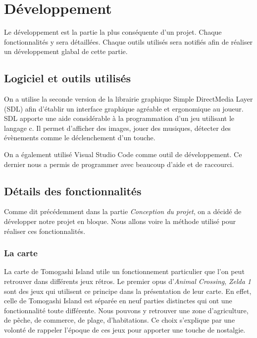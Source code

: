 \documentclass{article}
\begin{document}
\section{Développement}
    Le développement est la partie la plus conséquente d'un projet. Chaque fonctionnalités y sera détaillées. Chaque outils utilisés sera notifiés afin de réaliser un développement glabal de cette partie.

    \subsection{Logiciel et outils utilisés}
    On a utilise la seconde version de la librairie graphique Simple DirectMedia Layer (SDL) afin d’établir un interface graphique agréable et ergonomique au joueur. SDL apporte une aide considérable à la programmation d’un jeu utilisant le langage c. Il permet d’afficher des images, jouer des musiques, détecter des évènements comme le déclenchement d’un touche. 

    On a également utilisé Visual Studio Code comme outil de développement. Ce dernier nous a permis de programmer avec beaucoup d'aide et de raccourci. 

    
    \subsection{Détails des fonctionnalités}
        Comme dit précédemment dans la partie \textit{Conception du projet}, on a décidé de développer notre projet en bloque. Nous allons voire la méthode utilisé pour réaliser ces fonctionnalités.
        \subsubsection{La carte}
        La carte de Tomogashi Island utile un fonctionnement particulier que l’on peut retrouver dans différents jeux rétros. Le premier opus d’\textit{Animal Crossing}, \textit{Zelda 1} sont des jeux qui utilisent ce principe dans la présentation de leur carte. En effet, celle de Tomogashi Island  est séparée en neuf parties distinctes qui ont une fonctionnalité toute différente. Nous pouvons y retrouver une zone d’agriculture, de pêche, de commerce, de plage, d'habitations. Ce choix s'explique par une volonté de rappeler l'époque de ces jeux pour apporter une touche de nostalgie.

\end{document}
